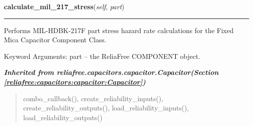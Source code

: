 \hspace{.8\funcindent}\begin{boxedminipage}{\funcwidth}

    \raggedright \textbf{calculate\_mil\_217\_stress}(\textit{self}, \textit{part})

    \vspace{-1.5ex}

    \rule{\textwidth}{0.5\fboxrule}
\setlength{\parskip}{2ex}
    Performs MIL-HDBK-217F part stress hazard rate calculations for the 
    Fixed Mica Capacitor Component Class.

    Keyword Arguments: part -- the ReliaFree COMPONENT object.

\setlength{\parskip}{1ex}
    \end{boxedminipage}


\large{\textbf{\textit{Inherited from reliafree.capacitors.capacitor.Capacitor\textit{(Section \ref{reliafree:capacitors:capacitor:Capacitor})}}}}

\begin{quote}
combo\_callback(), create\_reliability\_inputs(), create\_reliability\_outputs(), load\_reliability\_inputs(), load\_reliability\_outputs()
\end{quote}
